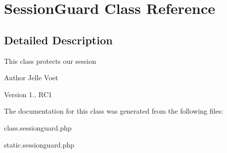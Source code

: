 \hypertarget{class_session_guard}{\section{Session\-Guard Class Reference}
\label{class_session_guard}
}


\subsection{Detailed Description}
This class protects our session

\begin{DoxyAuthor}{Author}
Jelle Voet 
\end{DoxyAuthor}
\begin{DoxyVersion}{Version}
1.. R\-C1 
\end{DoxyVersion}


The documentation for this class was generated from the following files\-:\begin{DoxyCompactItemize}
\item 
class.\-sessionguard.\-php\item 
static.\-sessionguard.\-php\end{DoxyCompactItemize}
